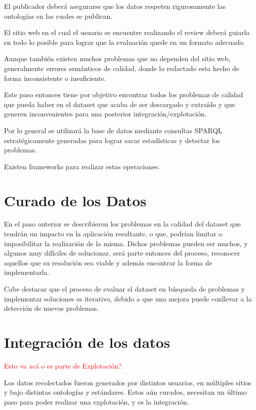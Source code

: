 El publicador deberá asegurarse que los datos respeten rigurosamente las ontologías en las cuales se publican.

El sitio web en el cual el usuario se encuentre realizando el review deberá guiarlo en todo lo posible para lograr que la evaluación
quede en un formato adecuado.


Aunque también existen muchos problemas que no dependen del sitio web, generalmente errores semánticos de calidad, donde lo 
redactado esta hecho de forma inconsistente o insuficiente.


Este paso entonces tiene por objetivo encontrar todos los problemas de calidad que pueda haber en el dataset que acaba de 
ser descargado y extraído y que generen inconvenientes para una posterior integración/explotación.

Por lo general se utilizará la base de datos mediante consultas SPARQL estratégicamente generadas para lograr sacar estadísticas y detectar los problemas.

Existen frameworks para realizar estas operaciones.

%
\section{Curado de los Datos}

En el paso anterior se describieron los problemas en la calidad del dataset que tendrán un impacto en la aplicación resultante, 
o que, podrían limitar o imposibilitar la realización de la misma. Dichos problemas pueden ser muchos, y algunos muy difíciles
de solucionar, será parte entonces del proceso, reconocer aquellos que su resolución sea viable y además encontrar la forma de 
implementarla.

Cabe destacar que el proceso de evaluar el dataset en búsqueda de problemas y implementar soluciones es iterativo, debido a que 
una mejora puede conllevar a la detección de nuevos problemas.

%

\section{Integración de los datos}
\begin{framed}
\textcolor{red}{Esto va acá o es parte de Explotación?}
\end{framed}


Los datos recolectados fueron generados por distintos usuarios, en múltiples sitios y bajo distintas ontologías y estándares.
Estos aún curados, necesitan un último paso para poder realizar una explotación, y es la integración.

